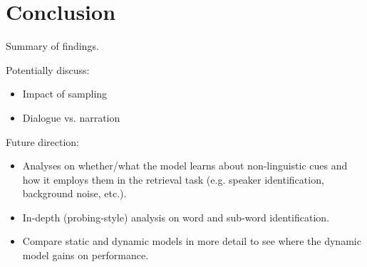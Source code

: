 \section{Conclusion}
\label{sec:conclusion}

Summary of findings.

Potentially discuss:
\begin{itemize}
\item Impact of sampling 
\item Dialogue vs. narration
\end{itemize}

Future direction:
\begin{itemize}
\item Analyses on whether/what the model learns about non-linguistic cues and how it employs them in the retrieval task (e.g. speaker identification, background noise, etc.). 
\item In-depth (probing-style) analysis on word and sub-word identification. 
\item Compare static and dynamic models in more detail to see where the dynamic model gains on performance. 
\end{itemize}